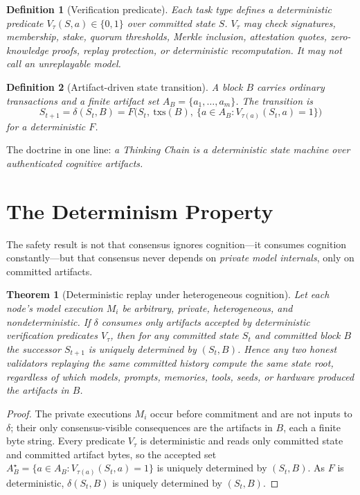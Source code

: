 \documentclass[11pt]{article}
\newtheorem{theorem}{Theorem}
\newtheorem{definition}{Definition}
\begin{document}
\begin{definition}[Verification predicate]
Each task type defines a deterministic predicate $V_\tau(S,a)\in\{0,1\}$ over committed state $S$. $V_\tau$ may check signatures, membership, stake, quorum thresholds, Merkle inclusion, attestation quotes, zero-knowledge proofs, replay protection, or deterministic recomputation. It may \emph{not} call an unreplayable model.
\end{definition}

\begin{definition}[Artifact-driven state transition]
A block $B$ carries ordinary transactions and a finite artifact set $A_B=\{a_1,\dots,a_m\}$. The transition is
\[ S_{t+1}=\delta(S_t,B)=F\big(S_t,\ \mathrm{txs}(B),\ \{a\in A_B : V_{\tau(a)}(S_t,a)=1\}\big) \]
for a deterministic $F$.
\end{definition}

\noindent The doctrine in one line: \emph{a Thinking Chain is a deterministic state machine over authenticated cognitive artifacts.}

\section{The Determinism Property}

The safety result is not that consensus ignores cognition---it consumes cognition constantly---but that consensus never depends on \emph{private model internals}, only on committed artifacts.

\begin{theorem}[Deterministic replay under heterogeneous cognition]
\label{thm:det}
Let each node's model execution $M_i$ be arbitrary, private, heterogeneous, and nondeterministic. If $\delta$ consumes only artifacts accepted by deterministic verification predicates $V_\tau$, then for any committed state $S_t$ and committed block $B$ the successor $S_{t+1}$ is uniquely determined by $(S_t,B)$. Hence any two honest validators replaying the same committed history compute the same state root, regardless of which models, prompts, memories, tools, seeds, or hardware produced the artifacts in $B$.
\end{theorem}
\begin{proof}
The private executions $M_i$ occur before commitment and are not inputs to $\delta$; their only consensus-visible consequences are the artifacts in $B$, each a finite byte string. Every predicate $V_\tau$ is deterministic and reads only committed state and committed artifact bytes, so the accepted set $A_B^\star=\{a\in A_B: V_{\tau(a)}(S_t,a)=1\}$ is uniquely determined by $(S_t,B)$. As $F$ is deterministic, $\delta(S_t,B)$ is uniquely determined by $(S_t,B)$.
\end{proof}
\end{document}
